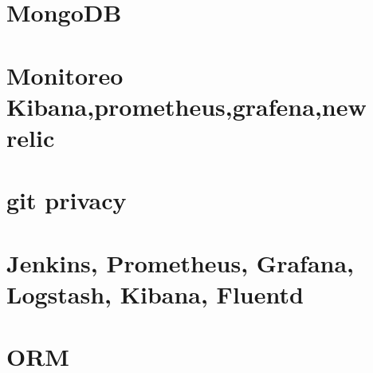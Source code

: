 \section{MongoDB}
\section{Monitoreo Kibana,prometheus,grafena,new relic}
\section{git privacy}
\section{Jenkins, Prometheus, Grafana, Logstash, Kibana, Fluentd}
\section{ORM}